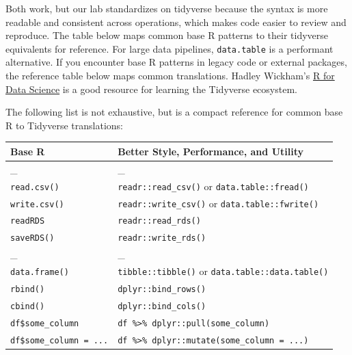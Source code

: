 \documentclass[
]{book}
\newcounter{none} %
\begin{document}
Both work, but our lab standardizes on tidyverse because the syntax is more readable and consistent across operations, which makes code easier to review and reproduce. The table below maps common base R patterns to their tidyverse equivalents for reference. For large data pipelines, \texttt{data.table} is a performant alternative. If you encounter base R patterns in legacy code or external packages, the reference table below maps common translations. Hadley Wickham's \href{https://r4ds.had.co.nz/}{R for Data Science} is a good resource for learning the Tidyverse ecosystem.

The following list is not exhaustive, but is a compact reference for common base R to Tidyverse translations:

{\def\LTcaptype{none} %
\begin{longtable}[]{@{}
  >{\raggedright\arraybackslash}p{}
  >{\raggedright\arraybackslash}p{}@{}}
\toprule\noalign{}
\begin{minipage}[b]{\linewidth}\raggedright
Base R
\end{minipage} & \begin{minipage}[b]{\linewidth}\raggedright
Better Style, Performance, and Utility
\end{minipage} \\
\midrule\noalign{}
\endhead
\bottomrule\noalign{}
\endlastfoot
\_ & \_ \\
\texttt{read.csv()} & \texttt{readr::read\_csv()} or \texttt{data.table::fread()} \\
\texttt{write.csv()} & \texttt{readr::write\_csv()} or \texttt{data.table::fwrite()} \\
\texttt{readRDS} & \texttt{readr::read\_rds()} \\
\texttt{saveRDS()} & \texttt{readr::write\_rds()} \\
\_ & \_ \\
\texttt{data.frame()} & \texttt{tibble::tibble()} or \texttt{data.table::data.table()} \\
\texttt{rbind()} & \texttt{dplyr::bind\_rows()} \\
\texttt{cbind()} & \texttt{dplyr::bind\_cols()} \\
\texttt{df\$some\_column} & \texttt{df\ \%\textgreater{}\%\ dplyr::pull(some\_column)} \\
\texttt{df\$some\_column\ =\ ...} & \texttt{df\ \%\textgreater{}\%\ dplyr::mutate(some\_column\ =\ ...)} \\

\end{longtable}}
\end{document}

